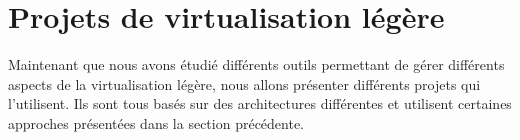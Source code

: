 \section{Projets de virtualisation légère}
\label{section:sota}

Maintenant que nous avons étudié différents outils permettant de gérer différents aspects de la virtualisation légère, nous allons présenter différents projets qui l'utilisent. Ils sont tous basés sur des architectures différentes et utilisent certaines approches présentées dans la section précédente.
